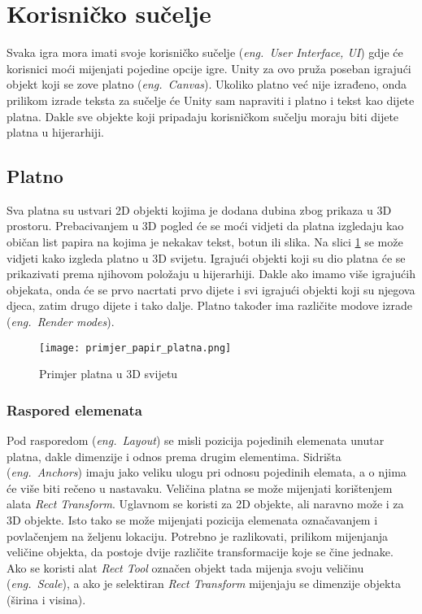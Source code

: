 \section{Korisničko sučelje}
Svaka igra mora imati svoje korisničko sučelje (\emph{eng.~User Interface, UI}) gdje će korisnici moći mijenjati pojedine opcije igre. Unity za ovo pruža poseban igrajući objekt koji se zove platno (\emph{eng.~Canvas}). Ukoliko platno već nije izrađeno, onda prilikom izrade teksta za sučelje će Unity sam napraviti i platno i tekst kao dijete platna. Dakle sve objekte koji pripadaju korisničkom sučelju moraju biti dijete platna u hijerarhiji.
\subsection{Platno}
Sva platna su ustvari 2D objekti kojima je dodana dubina zbog prikaza u 3D prostoru. Prebacivanjem u 3D pogled će se moći vidjeti da platna izgledaju kao običan list papira na kojima je nekakav tekst, botun ili slika. Na slici \ref{fig:primjer_platna} se može vidjeti kako izgleda platno u 3D svijetu. Igrajući objekti koji su dio platna će se prikazivati prema njihovom položaju u hijerarhiji. Dakle ako imamo više igrajućih objekata, onda će se prvo nacrtati prvo dijete i svi igrajući objekti koji su njegova djeca, zatim drugo dijete i tako dalje. Platno također ima različite modove izrade (\emph{eng.~Render modes}).
\begin{figure}[h]
	\texttt{[image: primjer\_papir\_platna.png]}
	\centering
	\caption{Primjer platna u 3D svijetu}
	\label{fig:primjer_platna}
\end{figure}

\subsubsection{Raspored elemenata}
Pod rasporedom (\emph{eng.~Layout}) se misli pozicija pojedinih elemenata unutar platna, dakle dimenzije i odnos prema drugim elementima. Sidrišta (\emph{eng.~Anchors}) imaju jako veliku ulogu pri odnosu pojedinih elemata, a o njima će više biti rečeno u nastavaku. Veličina platna se može mijenjati korištenjem alata \emph{Rect Transform}. Uglavnom se koristi za 2D objekte, ali naravno može i za 3D objekte. Isto tako se može mijenjati pozicija elemenata označavanjem i povlačenjem na željenu lokaciju. Potrebno je razlikovati, prilikom mijenjanja veličine objekta, da postoje dvije različite transformacije koje se čine jednake. Ako se koristi alat \emph{Rect Tool} označen objekt tada mijenja svoju veličinu (\emph{eng.~Scale}), a ako je selektiran \emph{Rect Transform} mijenjaju se dimenzije objekta (širina i visina). 

